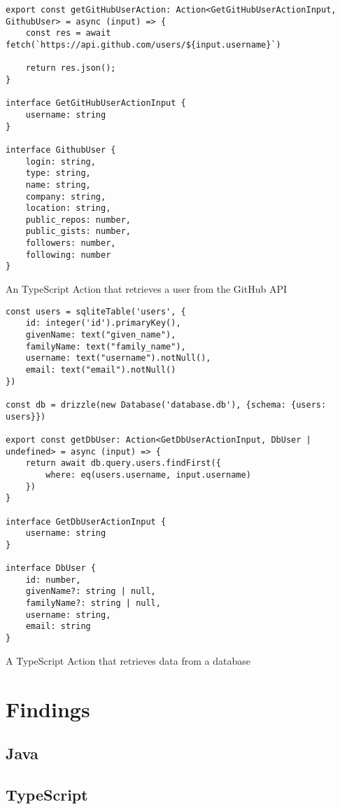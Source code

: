 \begin{listing}[H]
\begin{verbatim}
export const getGitHubUserAction: Action<GetGitHubUserActionInput, GithubUser> = async (input) => {
    const res = await fetch(`https://api.github.com/users/${input.username}`)
    
    return res.json();
}

interface GetGitHubUserActionInput {
    username: string
}

interface GithubUser {
    login: string,
    type: string,
    name: string,
    company: string,
    location: string,
    public_repos: number,
    public_gists: number,
    followers: number,
    following: number
}
\end{verbatim}
\caption{An TypeScript Action that retrieves a user from the GitHub API}
\end{listing}

\begin{listing}[H]
\begin{verbatim}
const users = sqliteTable('users', {
    id: integer('id').primaryKey(),
    givenName: text("given_name"),
    familyName: text("family_name"),
    username: text("username").notNull(),
    email: text("email").notNull()
})

const db = drizzle(new Database('database.db'), {schema: {users: users}})

export const getDbUser: Action<GetDbUserActionInput, DbUser | undefined> = async (input) => {
    return await db.query.users.findFirst({
        where: eq(users.username, input.username)
    })
}

interface GetDbUserActionInput {
    username: string
}

interface DbUser {
    id: number,
    givenName?: string | null,
    familyName?: string | null,
    username: string,
    email: string
}
\end{verbatim}
\caption{A TypeScript Action that retrieves data from a database}
\end{listing}

\section{Findings}
\subsection{Java}
\subsection{TypeScript}
